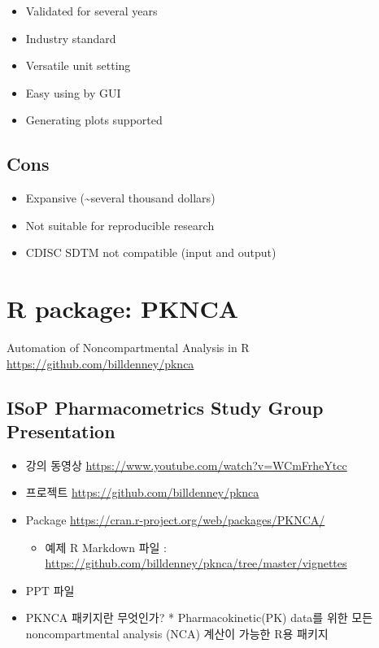 \documentclass[
  12pt,
]{krantz}
\providecommand{\tightlist}{%
  \setlength{\itemsep}{0pt}\setlength{\parskip}{0pt}}
\begin{document}
\begin{itemize}
\tightlist
\item
  Validated for several years
\item
  Industry standard
\item
  Versatile unit setting
\item
  Easy using by GUI
\item
  Generating plots supported
\end{itemize}

\hypertarget{cons}{%
\subsection{Cons}\label{cons}}

\begin{itemize}
\tightlist
\item
  Expansive (\textasciitilde several thousand dollars)
\item
  Not suitable for reproducible research
\item
  CDISC SDTM not compatible (input and output)
\end{itemize}

\hypertarget{r-package-pknca}{%
\section{R package: PKNCA}\label{r-package-pknca}}

Automation of Noncompartmental Analysis in R \url{https://github.com/billdenney/pknca}

\hypertarget{isop-pharmacometrics-study-group-presentation}{%
\subsection{ISoP Pharmacometrics Study Group Presentation}\label{isop-pharmacometrics-study-group-presentation}}

\begin{itemize}
\tightlist
\item
  강의 동영상 \url{https://www.youtube.com/watch?v=WCmFrheYtcc}
\item
  프로젝트 \url{https://github.com/billdenney/pknca}
\item
  Package \url{https://cran.r-project.org/web/packages/PKNCA/}

  \begin{itemize}
  \tightlist
  \item
    예제 R Markdown 파일 : \url{https://github.com/billdenney/pknca/tree/master/vignettes}
  \end{itemize}
\item
  PPT 파일
\item
  PKNCA 패키지란 무엇인가? * Pharmacokinetic(PK) data를 위한 모든 noncompartmental analysis (NCA) 계산이 가능한 R용 패키지
\end{itemize}
\end{document}
